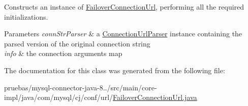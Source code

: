 Constructs an instance of \mbox{\hyperlink{classcom_1_1mysql_1_1cj_1_1conf_1_1url_1_1_failover_connection_url}{Failover\+Connection\+Url}}, performing all the required initializations.


\begin{DoxyParams}{Parameters}
{\em conn\+Str\+Parser} & a \mbox{\hyperlink{classcom_1_1mysql_1_1cj_1_1conf_1_1_connection_url_parser}{Connection\+Url\+Parser}} instance containing the parsed version of the original connection string \\
\hline
{\em info} & the connection arguments map \\
\hline
\end{DoxyParams}


The documentation for this class was generated from the following file\+:\begin{DoxyCompactItemize}
\item 
pruebas/mysql-\/connector-\/java-\/8../src/main/core-\/impl/java/com/mysql/cj/conf/url/\mbox{\hyperlink{_failover_connection_url_8java}{Failover\+Connection\+Url.\+java}}\end{DoxyCompactItemize}
